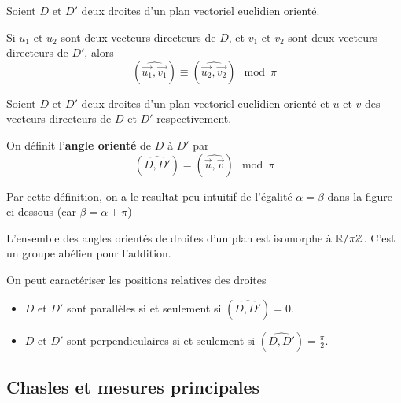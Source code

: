 \documentclass[a4paper, 12pt]{article}
\begin{document}
\begin{proposition}{}{}
    Soient $D$ et $D'$ deux droites d'un plan vectoriel euclidien orienté.

    Si $u_1$ et $u_2$ sont deux vecteurs directeurs de $D$, et $v_1$ et $v_2$ sont deux vecteurs directeurs de $D'$, alors
    $$
    (\widehat{\overrightarrow{u_1}, \overrightarrow{v_1}}) \equiv (\widehat{\overrightarrow{u_2}, \overrightarrow{v_2}}) \mod \pi
    $$
\end{proposition}

\begin{definition}
    Soient $D$ et $D'$ deux droites d'un plan vectoriel euclidien orienté et $u$ et $v$ des vecteurs directeurs de $D$ et $D'$ respectivement.

    On définit l'\textbf{angle orienté} de $D$ à $D'$ par
    $$
    (\widehat{D, D'}) = (\widehat{\overrightarrow{u}, \overrightarrow{v}}) \mod \pi
    $$
\end{definition}

\begin{remarque}
    Par cette définition, on a le resultat peu intuitif de l'égalité $\alpha = \beta$ dans la figure ci-dessous (car $\beta = \alpha + \pi$)
\end{remarque}

\tikzexternalenable
\begin{figure}[H]
    \centering
    \resizebox{0.6\textwidth}{!}{%
    
    }
\end{figure}
\tikzexternaldisable

\begin{remarque}
    L'ensemble des angles orientés de droites d'un plan est isomorphe à $\mathbb{R} / \pi\mathbb{Z}$.
    C'est un groupe abélien pour l'addition.
\end{remarque}

\begin{remarque}
    On peut caractériser les positions relatives des droites
    \begin{itemize}
        \item $D$ et $D'$ sont parallèles si et seulement si $(\widehat{D, D'}) = 0$.
        \item $D$ et $D'$ sont perpendiculaires si et seulement si $(\widehat{D, D'}) = \frac{\pi}{2}$.
    \end{itemize}
\end{remarque}

\subsection{Chasles et mesures principales}
\end{document}
